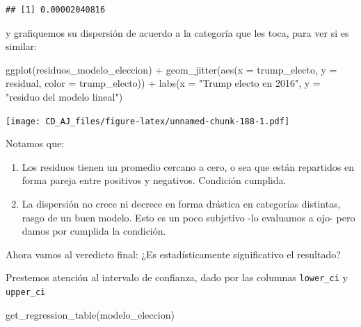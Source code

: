 \documentclass[
]{book}
\newenvironment{Shaded}{\begin{snugshade}}{\end{snugshade}}
\newcommand{\AttributeTok}[1]{\textcolor[rgb]{0.77,0.63,0.00}{#1}}
\newcommand{\FunctionTok}[1]{\textcolor[rgb]{0.00,0.00,0.00}{#1}}
\newcommand{\NormalTok}[1]{#1}
\newcommand{\SpecialCharTok}[1]{\textcolor[rgb]{0.00,0.00,0.00}{#1}}
\newcommand{\StringTok}[1]{\textcolor[rgb]{0.31,0.60,0.02}{#1}}
\providecommand{\tightlist}{%
  \setlength{\itemsep}{0pt}\setlength{\parskip}{0pt}}
\begin{document}
\begin{Shaded}
\end{Shaded}

\begin{verbatim}
## [1] 0.00002040816
\end{verbatim}

y grafiquemos su dispersión de acuerdo a la categoría que les toca, para ver si es similar:

\begin{Shaded}
\begin{Highlighting}[]
\FunctionTok{ggplot}\NormalTok{(residuos\_modelo\_eleccion) }\SpecialCharTok{+}
    \FunctionTok{geom\_jitter}\NormalTok{(}\FunctionTok{aes}\NormalTok{(}\AttributeTok{x =}\NormalTok{ trump\_electo, }\AttributeTok{y =}\NormalTok{ residual, }\AttributeTok{color =}\NormalTok{ trump\_electo)) }\SpecialCharTok{+}
    \FunctionTok{labs}\NormalTok{(}\AttributeTok{x =} \StringTok{"Trump electo en 2016"}\NormalTok{, }\AttributeTok{y =} \StringTok{"residuo del modelo lineal"}\NormalTok{)}
\end{Highlighting}
\end{Shaded}

\texttt{[image: CD\_AJ\_files/figure-latex/unnamed-chunk-188-1.pdf]}

Notamos que:

\begin{enumerate}
\def\labelenumi{\arabic{enumi}.}
\tightlist
\item
  Los residuos tienen un promedio cercano a cero, o sea que están repartidos en forma pareja entre positivos y negativos. Condición cumplida.
\item
  La dispersión no crece ni decrece en forma drástica en categorías distintas, rasgo de un buen modelo. Esto es un poco subjetivo -lo evaluamos a ojo- pero damos por cumplida la condición.
\end{enumerate}

Ahora vamos al veredicto final: ¿Es estadísticamente significativo el resultado?

Prestemos atención al intervalo de confianza, dado por las columnas \texttt{lower\_ci} y \texttt{upper\_ci}

\begin{Shaded}
\begin{Highlighting}[]
\FunctionTok{get\_regression\_table}\NormalTok{(modelo\_eleccion)}
\end{Highlighting}
\end{Shaded}
\end{document}
